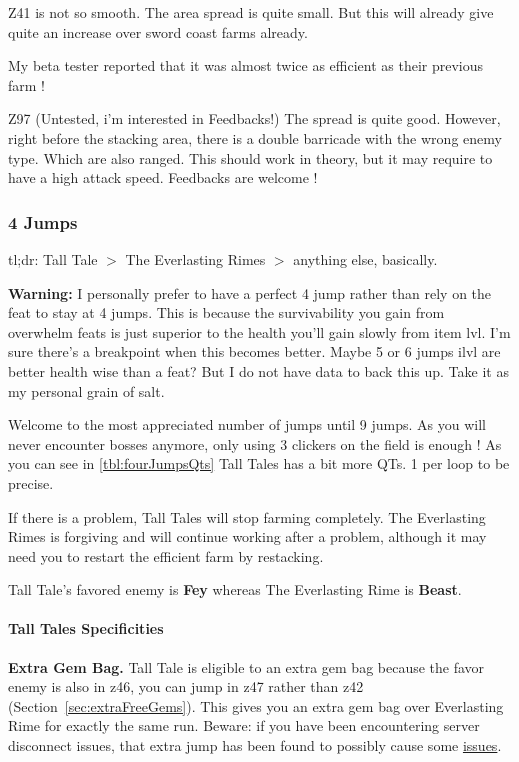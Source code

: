 \documentclass{article}
\begin{document}
Z41 is not so smooth.
The area spread is quite small.
But this will already give quite an increase over sword coast farms already.

My beta tester reported that it was almost twice as efficient as their previous farm !

Z97 (Untested, i'm interested in Feedbacks!)
The spread is quite good.
However, right before the stacking area, there is a double barricade with the wrong enemy type.
Which are also ranged.
This should work in theory, but it may require to have a high attack speed.
Feedbacks are welcome !


\subsubsection{4 Jumps}

tl;dr: Tall Tale $>$ The Everlasting Rimes $>$ anything else, basically.

\textbf{Warning:} I personally prefer to have a perfect 4 jump rather than rely on the feat to stay at 4 jumps.
This is because the survivability you gain from overwhelm feats is just superior to the health you'll gain slowly from item lvl.
I'm sure there's a breakpoint when this becomes better.
Maybe 5 or 6 jumps ilvl are better health wise than a feat? 
But I do not have data to back this up.
Take it as my personal grain of salt.

Welcome to the most appreciated number of jumps until 9 jumps.
As you will never encounter bosses anymore, only using 3 clickers on the field is enough !
As you can see in \ref{tbl:fourJumpsQts} Tall Tales has a bit more QTs.
1 per loop to be precise.

If there is a problem, Tall Tales will stop farming completely.
The Everlasting Rimes is forgiving and will continue working after a problem, although it may need you to restart the efficient farm by restacking\briv.

Tall Tale's favored enemy is \textbf{Fey} whereas The Everlasting Rime is \textbf{Beast}.

\paragraph{Tall Tales Specificities}

\textbf{Extra Gem Bag.}
Tall Tale is eligible to an extra gem bag because the favor enemy is also in z46, you can jump in z47 rather than z42 (Section~\ref{sec:extraFreeGems}).
This gives you an extra gem bag over Everlasting Rime for exactly the same run.
Beware: if you have been encountering server disconnect issues, that extra jump has been found to possibly cause some \href{https://discord.com/channels/357247482247380994/808221941722906655/1004051568145989733}{issues}.
\end{document}
